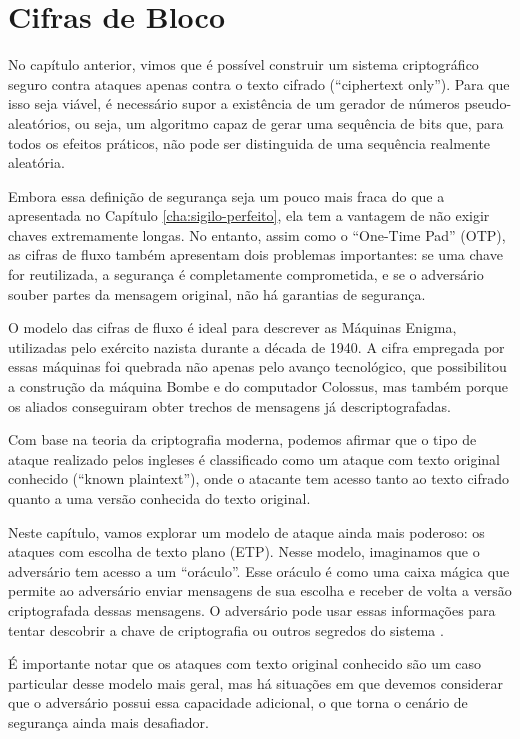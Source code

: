 \chapter{Cifras de Bloco}
\label{cha:cifras-de-bloco}

No capítulo anterior, vimos que é possível construir um sistema criptográfico seguro contra ataques apenas contra o texto cifrado (``ciphertext only'').
Para que isso seja viável, é necessário supor a existência de um gerador de números pseudo-aleatórios, ou seja, um algoritmo capaz de gerar uma sequência de bits que, para todos os efeitos práticos, não pode ser distinguida de uma sequência realmente aleatória.

Embora essa definição de segurança seja um pouco mais fraca do que a apresentada no Capítulo \ref{cha:sigilo-perfeito}, ela tem a vantagem de não exigir chaves extremamente longas.
No entanto, assim como o ``One-Time Pad'' (OTP), as cifras de fluxo também apresentam dois problemas importantes:
se uma chave for reutilizada, a segurança é completamente comprometida, e se o adversário souber partes da mensagem original, não há garantias de segurança.

O modelo das cifras de fluxo é ideal para descrever as Máquinas Enigma, utilizadas pelo exército nazista durante a década de 1940.
A cifra empregada por essas máquinas foi quebrada não apenas pelo avanço tecnológico, que possibilitou a construção da máquina Bombe e do computador Colossus, mas também porque os aliados conseguiram obter trechos de mensagens já descriptografadas.

Com base na teoria da criptografia moderna, podemos afirmar que o tipo de ataque realizado pelos ingleses é classificado como um ataque com texto original conhecido (``known plaintext''), onde o atacante tem acesso tanto ao texto cifrado quanto a uma versão conhecida do texto original.

Neste capítulo, vamos explorar um modelo de ataque ainda mais poderoso:
os ataques com escolha de texto plano (ETP).
Nesse modelo, imaginamos que o adversário tem acesso a um ``oráculo''.
Esse oráculo é como uma caixa mágica que permite ao adversário enviar mensagens de sua escolha e receber de volta a versão criptografada dessas mensagens.
O adversário pode usar essas informações para tentar descobrir a chave de criptografia ou outros segredos do sistema \cite{Bellare97}.

É importante notar que os ataques com texto original conhecido são um caso particular desse modelo mais geral, mas há situações em que devemos considerar que o adversário possui essa capacidade adicional, o que torna o cenário de segurança ainda mais desafiador.


